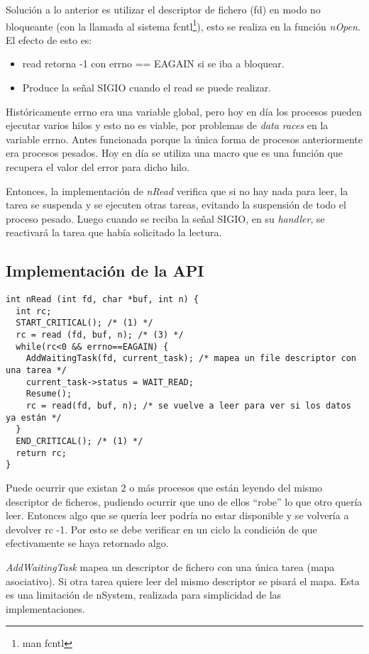 Solución a lo anterior es utilizar el descriptor de fichero (fd) en modo no bloqueante (con la llamada al sistema fcntl\footnote{man fcntl}), esto se realiza en la función \textit{nOpen}. El efecto de esto es:

\begin{itemize}
	\item read retorna -1 con errno == EAGAIN si se iba a bloquear.
	\item Produce la señal SIGIO cuando el read se puede realizar.
\end{itemize}

Históricamente errno era una variable global, pero hoy en día los procesos pueden ejecutar varios hilos y esto no es viable, por problemas de \textit{data races} en la variable errno. Antes funcionada porque la única forma de procesos anteriormente era procesos pesados. Hoy en día se utiliza una macro que es una función que recupera el valor del error para dicho hilo.

Entonces, la implementación de \textit{nRead} verifica que si no hay nada para leer, la tarea se suspenda y se ejecuten otras tareas, evitando la suspensión de todo el proceso pesado. Luego cuando se reciba la señal SIGIO, en su \textit{handler}, se reactivará la tarea que había solicitado la lectura.

\subsection{Implementación de la API}

\begin{verbatim}
int nRead (int fd, char *buf, int n) {
  int rc;
  START_CRITICAL(); /* (1) */
  rc = read (fd, buf, n); /* (3) */
  while(rc<0 && errno==EAGAIN) {
    AddWaitingTask(fd, current_task); /* mapea un file descriptor con una tarea */
    current_task->status = WAIT_READ;
    Resume();
    rc = read(fd, buf, n); /* se vuelve a leer para ver si los datos ya están */
  }
  END_CRITICAL(); /* (1) */
  return rc;
}
\end{verbatim}

Puede ocurrir que existan 2 o más procesos que están leyendo del mismo descriptor de ficheros, pudiendo ocurrir que uno de ellos ``robe'' lo que otro quería leer. Entonces algo que se quería leer podría no estar disponible y se volvería a devolver rc -1. Por esto se debe verificar en un ciclo la condición de que efectivamente se haya retornado algo.

\textit{AddWaitingTask} mapea un descriptor de fichero con una única tarea (mapa asociativo). Si otra tarea quiere leer del mismo descriptor se pisará el mapa. Esta es una limitación de nSystem, realizada para simplicidad de las implementaciones.

